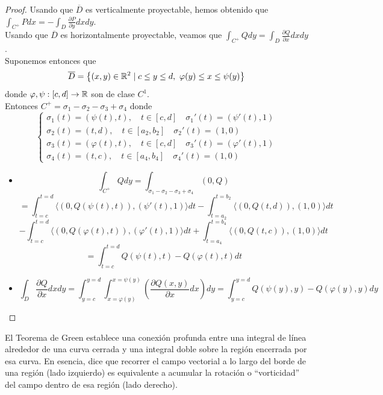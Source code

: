 \begin{proof}
    Usando que $\overline{D}$ es verticalmente proyectable, hemos obtenido que
    $\int_{C^+} Pdx = -\int_{D} \frac{\partial P}{\partial y}dxdy$.\\ Usando que
    $\overline{D}$ es horizontalmente proyectable, veamos que $\int_{C^+} Qdy =
        \int_{D} \frac{\partial Q}{\partial x}dxdy$.\\ Suponemos entonces que
    $$\overline{D} = \left\{ (x,y) \in \mathbb{R}^2 \mid c \leq y \leq d, \ \varphi(y) \leq
        x \leq \psi(y) \right\}$$ donde $\varphi, \psi: [c,d] \to \mathbb{R}$ son de clase
    $C^1$.\\ Entonces $C^+ = \sigma_1 - \sigma_2 - \sigma_3 + \sigma_4$ donde $$
        \begin{cases}
            \sigma_1(t) = (\psi(t), t), \quad t \in [c,d] \quad \sigma_1'(t) = (\psi'(t), 1)       \\
            \sigma_2(t) = (t, d), \quad t \in [a_2, b_2] \quad \sigma_2'(t) = (1, 0)               \\
            \sigma_3(t) = (\varphi(t), t), \quad t \in [c,d] \quad \sigma_3'(t) = (\varphi'(t), 1) \\
            \sigma_4(t) = (t, c), \quad t \in [a_4, b_4] \quad \sigma_4'(t) = (1, 0)
        \end{cases}
    $$

    \begin{itemize}
        \item $$\int_{C^+} Qdy = \int_{\sigma_1 - \sigma_2 - \sigma_3 + \sigma_4} (0,Q) $$
              $$= \int_{t=c}^{t=d} \langle (0,Q(\psi(t),t)), (\psi'(t),1) \rangle dt - \int_{t=a_2}^{t=b_2} \langle (0,Q(t,d)), (1,0) \rangle dt $$
              $$- \int_{t=c}^{t=d} \langle (0,Q(\varphi(t),t)), (\varphi'(t),1) \rangle dt + \int_{t=a_4}^{t=b_4} \langle (0,Q(t,c)), (1,0) \rangle dt $$
              $$= \int_{t=c}^{t=d} Q(\psi(t),t) - Q(\varphi(t),t) dt$$
        \item $$\int_{D} \frac{\partial Q}{\partial x}dxdy = \int_{y=c}^{y=d} \int_{x=\varphi(y)}^{x=\psi(y)} \left( \frac{\partial Q(x,y)}{\partial x} dx \right) dy = \int_{y=c}^{y=d} Q(\psi(y),y) - Q(\varphi(y),y) dy$$
    \end{itemize}

\end{proof}
 
El Teorema de Green establece una conexión profunda entre una integral de línea
alrededor de una curva cerrada y una integral doble sobre la región encerrada
por esa curva. En esencia, dice que recorrer el campo vectorial a lo largo del
borde de una región (lado izquierdo) es equivalente a acumular la rotación o
“vorticidad” del campo dentro de esa región (lado derecho).

